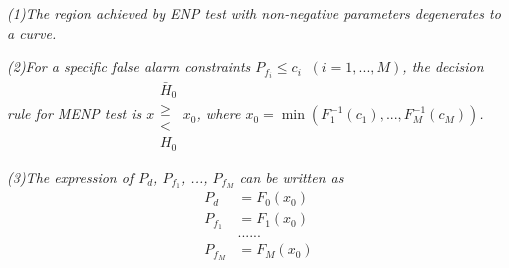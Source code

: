 \textit{(1)The region achieved by ENP test with non-negative parameters degenerates to a curve.}

\textit{(2)For a specific false alarm constraints $P_{f_i} \leq c_i\;\;(i = 1, ..., M)$, the decision rule for MENP test is $x \substack{\bar{H}_0 \\ \geq \\ < \\H_0} x_0$, where $x_0 = \min(F_1^{-1}(c_1), ..., F_M^{-1}(c_M))$.}

\textit{(3)The expression of $P_d$, $P_{f_1}$, ..., $P_{f_M}$ can be written as}
\begin{equation}
\label{equ: chi pd}
  \begin{split}
    P_d & = F_0(x_0)\\
        P_{f_1} & = F_1(x_0)\\
        &......\\
            P_{f_M} & = F_M(x_0)
  \end{split}
\end{equation}

